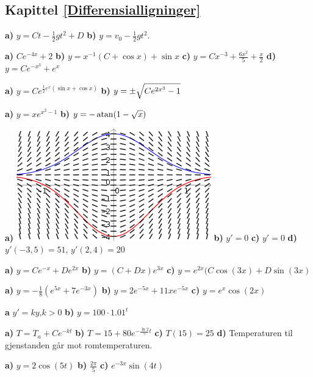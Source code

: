 




\subsection*{Kapittel \ref{Differensialligninger}}
\footnotesize

\textbf{a)} $y= Ct-\frac{1}{2}gt^2+D $
\textbf{b)} $ y=v_0-\frac{1}{2}gt^2 $.

 \sel

\textbf{a)} $ Ce^{-4x}+2 $
\textbf{b)} $ y = x^{-1}(C+\cos x)+\sin x $
\textbf{c)} $ y = Cx^{-3} + \frac{6 x^2}{5} + \frac{x}{2} $ 
\textbf{d)} $ y = Ce^{-x^3}+e^x$

\textbf{a)} $ y= C e^{\frac{1}{2} e^x(\sin x + \cos x)} $
\textbf{b)} $ y= \pm\sqrt{\strut Ce^{2 x^3} - 1}$

\textbf{a)} $ y = xe^{x^2-1} $
\textbf{b)} $ y=-\operatorname{atan}(1-\sqrt{x}) $

\textbf{a)}
\includegraphics[scale=1.3]{retnfas} \textbf{b)} $ y'=0 $ \textbf{c)} $ y'=0 $ \textbf{d)} $ y'(-3, 5)=51 $, $ y'(2, 4)=20 $

\textbf{a)} $ y=Ce^{-x}+De^{2x} $ 
\textbf{b)} $ y= (C+Dx)e^{3x} $
\textbf{c)} $ y= e^{2x}(C\cos(3x)+D\sin(3x)$

\textbf{a)} $ y = -\frac{1}{8}\left(e^{5x}+7e^{-3x}\right) $
\textbf{b)} $ y=2e^{-5x}+11xe^{-5x} $
\textbf{c)} $ y= e^x\cos(2x) $

\textbf{a} $ y'=ky $\;,\;$ k>0 $ \textbf{b)} $ y = 100\cdot1.01^t $

\textbf{a)} $ T= T_a+Ce^{-kt} $
\textbf{b)} $ T=15+80e^{-\frac{\ln 2}{5}t}  $ \textbf{c)} $ T(15)=25 $ \textbf{d)} Temperaturen til gjenstanden går mot romtemperaturen.

 \sel

 \textbf{a)} $ y=2\cos(5t) $ \textbf{b)} $ \frac{2\pi}{5} $ \textbf{c)} $ e^{-3x}\sin(4t) $

